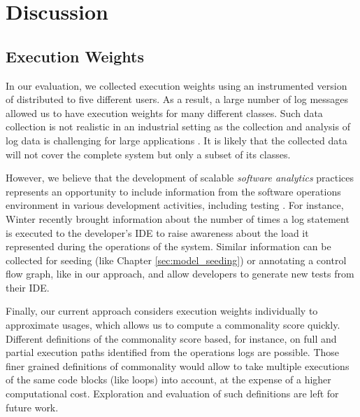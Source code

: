 
\section{Discussion}
\label{sec:cub:discussion}

\subsection{Execution Weights}

In our evaluation, we collected execution weights using an instrumented version of \jabref distributed to five different users. As a result, a large number of log messages allowed us to have execution weights for many different classes. Such data collection is not realistic in an industrial setting as the collection and analysis of log data is challenging for large applications \cite{Candido2019}. It is likely that the collected data will not cover the complete system but only a subset of its classes. 

However, we believe that the development of scalable \emph{software analytics} practices \cite{Menzies2013} represents an opportunity to include information from the software operations environment in various development activities, including testing \cite{Candido2019, Chen2018d}. For instance, Winter \etal \cite{Winter2019} recently brought information about the number of times a log statement is executed to the developer's IDE to raise awareness about the load it represented during the operations of the system. Similar information can be collected for seeding (like Chapter \ref{sec:model_seeding}) or annotating a control flow graph, like in our approach, and allow developers to generate new tests from their IDE.

Finally, our current approach considers execution weights individually to approximate usages, which allows us to compute a commonality score quickly. Different definitions of the commonality score based, for instance, on full and partial execution paths identified from the operations logs are possible. Those finer grained definitions of commonality would allow to take multiple executions of the same code blocks (like loops) into account, at the expense of a higher computational cost. Exploration and evaluation of such definitions are left for future work. 


